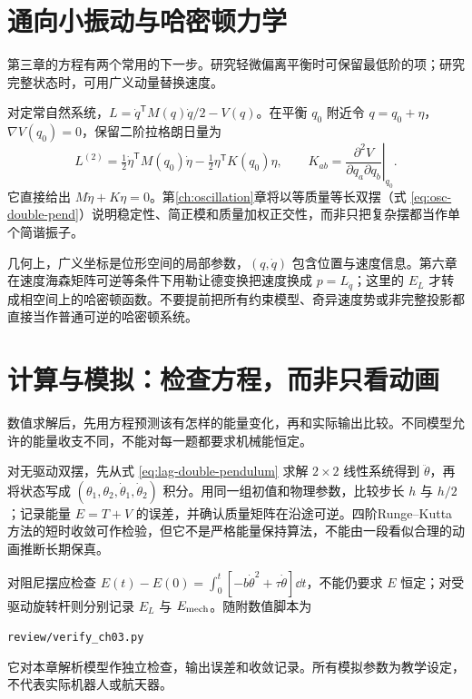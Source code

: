 \section{通向小振动与哈密顿力学}
第三章的方程有两个常用的下一步。研究轻微偏离平衡时可保留最低阶的项；研究完整状态时，可用广义动量替换速度。

对定常自然系统，$L=\dot q^{\mathsf T}M(q)\dot q/2-V(q)$。在平衡 $q_0$ 附近令 $q=q_0+\eta$，$\nabla V(q_0)=0$，保留二阶拉格朗日量为
\[
L^{(2)}=\tfrac12\dot\eta^{\mathsf T}M(q_0)\dot\eta
-\tfrac12\eta^{\mathsf T}K(q_0)\eta,
\qquad K_{ab}=\left.\frac{\partial^2V}{\partial q_a\partial q_b}\right|_{q_0}.
\]
它直接给出 $M\ddot\eta+K\eta=0$。第\ref{ch:oscillation}章将以等质量等长双摆（式 \eqref{eq:osc-double-pend}）说明稳定性、简正模和质量加权正交性，而非只把复杂摆都当作单个简谐振子。

几何上，广义坐标是位形空间的局部参数，$(q,\dot q)$ 包含位置与速度信息。第六章在速度海森矩阵可逆等条件下用勒让德变换把速度换成 $p=L_{\dot q}$；这里的 $E_L$ 才转成相空间上的哈密顿函数。不要提前把所有约束模型、奇异速度势或非完整投影都直接当作普通可逆的哈密顿系统。

\section{计算与模拟：检查方程，而非只看动画}
数值求解后，先用方程预测该有怎样的能量变化，再和实际输出比较。不同模型允许的能量收支不同，不能对每一题都要求机械能恒定。

对无驱动双摆，先从式 \eqref{eq:lag-double-pendulum} 求解 $2\times2$ 线性系统得到 $\ddot\theta$，再将状态写成 $(\theta_1,\theta_2,\dot\theta_1,\dot\theta_2)$ 积分。用同一组初值和物理参数，比较步长 $h$ 与 $h/2$；记录能量 $E=T+V$ 的误差，并确认质量矩阵在沿途可逆。四阶Runge--Kutta方法的短时收敛可作检验，但它不是严格能量保持算法，不能由一段看似合理的动画推断长期保真。

对阻尼摆应检查 $E(t)-E(0)=\int_0^t[-b\dot\theta^2+\tau\dot\theta]\dd t$，不能仍要求 $E$ 恒定；对受驱动旋转杆则分别记录 $E_L$ 与 $E_{\rm mech}$。随附数值脚本为
\begin{center}\texttt{review/verify\_ch03.py}\end{center}
它对本章解析模型作独立检查，输出误差和收敛记录。所有模拟参数为教学设定，不代表实际机器人或航天器。

